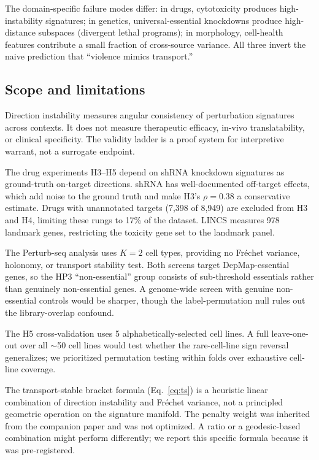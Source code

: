 \documentclass{article}
\begin{document}
The domain-specific failure modes differ: in drugs, cytotoxicity
produces high-instability signatures; in genetics, universal-essential
knockdowns produce high-distance subspaces (divergent lethal programs);
in morphology, cell-health features contribute a small fraction of
cross-source variance. All three invert the naive prediction that
``violence mimics transport.''

\subsection{Scope and limitations}

Direction instability measures angular consistency of perturbation signatures
across contexts. It does not measure therapeutic efficacy, in-vivo
translatability, or clinical specificity. The validity ladder is a proof
system for interpretive warrant, not a surrogate endpoint.

The drug experiments H3--H5 depend on shRNA knockdown signatures as
ground-truth on-target directions. shRNA has well-documented off-target
effects, which add noise to the ground truth and make H3's $\rho = 0.38$
a conservative estimate. Drugs with unannotated targets (7{,}398 of
8{,}949) are excluded from H3 and H4, limiting these rungs to 17\% of the
dataset. LINCS measures 978 landmark genes, restricting the toxicity gene
set to the landmark panel.

The Perturb-seq analysis uses $K = 2$ cell types, providing no Fr\'echet
variance, holonomy, or transport stability test. Both screens target
DepMap-essential genes, so the HP3 ``non-essential'' group consists of
sub-threshold essentials rather than genuinely non-essential genes. A
genome-wide screen with genuine non-essential controls would be sharper,
though the label-permutation null rules out the library-overlap confound.

The H5 cross-validation uses 5 alphabetically-selected cell lines.
A full leave-one-out over all $\sim$50 cell lines would test whether the
rare-cell-line sign reversal generalizes; we prioritized permutation
testing within folds over exhaustive cell-line coverage.

The transport-stable bracket formula (Eq.~\ref{eq:ts}) is a heuristic
linear combination of direction instability and Fr\'echet variance, not a
principled geometric operation on the signature manifold. The penalty
weight was inherited from the companion paper and was not optimized.
A ratio or a geodesic-based combination might perform differently; we
report this specific formula because it was pre-registered.
\end{document}
